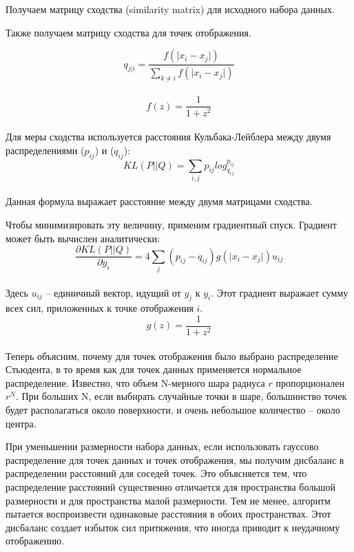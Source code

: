 Получаем матрицу сходства (similarity matrix) для исходного набора данных.

Также получаем матрицу сходства для точек отображения.

\begin{equation}\label{eq:qconditionsimilarity}
q_{j \vert i}  = \frac{f( \vert x_i - x_j \vert)}{  \sum \limits_{k \neq i}^{} f( \vert x_i - x_j \vert)}  
\end{equation}  \\

\begin{equation}\label{eq:f}
f(z)  = \frac{1}{  1 + z^2}  
\end{equation}  \\


Для меры сходства используется расстояния Кульбака-Лейблера между двумя распределениями ($ p_{ij} $) и ($q_{ij} $):
\begin{equation}\label{eq:distance}
KL(P \vert \vert Q) = \sum_{i,j} p_{ij} log_{q_{ij}}^{p_{ij}}
\end{equation}  \\

Данная формула выражает расстояние между двумя матрицами сходства.

Чтобы минимизировать эту величину, применим градиентный спуск. Градиент может быть вычислен аналитически:
\begin{equation}\label{eq:gradient}
\frac{ \partial KL(P \vert \vert Q)}{\partial y_i} =  4 \sum_j(p_{ij} - q_{ij})g(\vert x_i - x_j \vert)u_{ij} 
\end{equation}  \\

Здесь $ u_{ij} $ – единичный вектор, идущий от $y_j $ к $ y_i $. Этот градиент выражает сумму всех сил, приложенных к точке отображения $ i$.
\begin{equation}\label{eq:f}
g(z)  = \frac{1}{  1 + z^2}  
\end{equation}  \\

Теперь объясним, почему для точек отображения было выбрано распределение Стьюдента, в то время как для точек данных применяется нормальное распределение. Известно, что объем N-мерного шара радиуса $ r $ пропорционален $ r^N $. При больших N, если выбирать случайные точки в шаре, большинство точек будет располагаться около поверхности, и очень небольшое количество – около центра.

При уменьшении размерности набора данных, если использовать гауссово распределение для точек данных и точек отображения, мы получим дисбаланс в распределении расстояний для соседей точек. Это объясняется тем, что распределение расстояний существенно отличается для пространства большой размерности и для пространства малой размерности. Тем не менее, алгоритм пытается воспроизвести одинаковые расстояния в обоих пространствах. Этот дисбаланс создает избыток сил притяжения, что иногда приводит к неудачному отображению.

